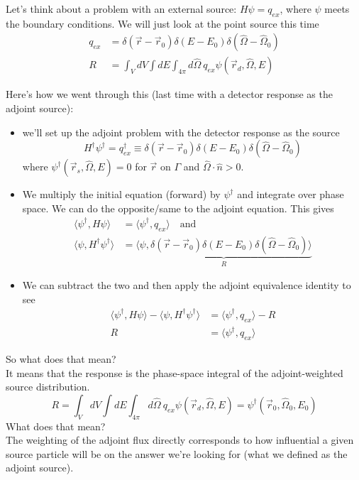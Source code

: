 \documentclass[12pt]{article}
\newcommand{\rvec}{\ensuremath{\vec{r}}}
\newcommand{\vOmega}{\ensuremath{\hat{\Omega}}}
\begin{document}
Let's think about a problem with an external source: $H \psi = q_{ex}$, where $\psi$ meets the boundary conditions. We will just look at the point source this time
%
\begin{align*}
q_{ex} &= \delta(\rvec - \rvec_0) \delta(E - E_0) \delta(\vOmega - \vOmega_0) \\
R &= \int_V dV \int dE \int_{4\pi} d\vOmega\: q_{ex} \psi(\rvec_d, \vOmega, E)%
\end{align*}

Here's how we went through this (last time with a detector response as the adjoint source):
\begin{itemize}
\item we'll set up the adjoint problem with the detector response as the source
\[H^{\dagger}\psi^{\dagger} = q_{ex}^{\dagger} \equiv  \delta(\rvec - \rvec_0) \delta(E - E_0) \delta(\vOmega - \vOmega_0)\]
where $\psi^{\dagger}(\vec{r}_s, \vOmega, E) = 0$ for $\rvec$ on $\Gamma$ and $\vOmega \cdot \hat{n} > 0$.
%
\item We multiply the initial equation (forward) by $\psi^{\dagger}$ and integrate over phase space. We can do the opposite/same to the adjoint equation. This gives
\begin{align*}
\langle\psi^{\dagger}, H\psi\rangle &= \langle\psi^{\dagger}, q_{ex}\rangle \quad \text{and}\\
\langle\psi, H^{\dagger} \psi^{\dagger}\rangle &= \underbrace{\langle\psi, \delta(\rvec - \rvec_0) \delta(E - E_0) \delta(\vOmega - \vOmega_0)\rangle }_R
\end{align*}
%
\item We can subtract the two and then apply the adjoint equivalence identity to see
\begin{align*}
\langle\psi^{\dagger}, H\psi\rangle - \langle\psi, H^{\dagger} \psi^{\dagger}\rangle &= \langle\psi^{\dagger}, q_{ex}\rangle - R \\
R &= \langle\psi^{\dagger}, q_{ex}\rangle
\end{align*}
\end{itemize}
%
So what does that mean? \\
It means that the response is the phase-space integral of the adjoint-weighted source distribution. 
\[
R = \int_V dV \int dE \int_{4\pi} d\vOmega\: q_{ex} \psi(\rvec_d, \vOmega, E)=\psi^{\dagger}(\rvec_0, \vOmega_0, E_0)
\]
What does that mean? \\
The weighting of the adjoint flux directly corresponds to how influential a given source particle will be on the answer we're looking for (what we defined as the adjoint source).
\end{document}
